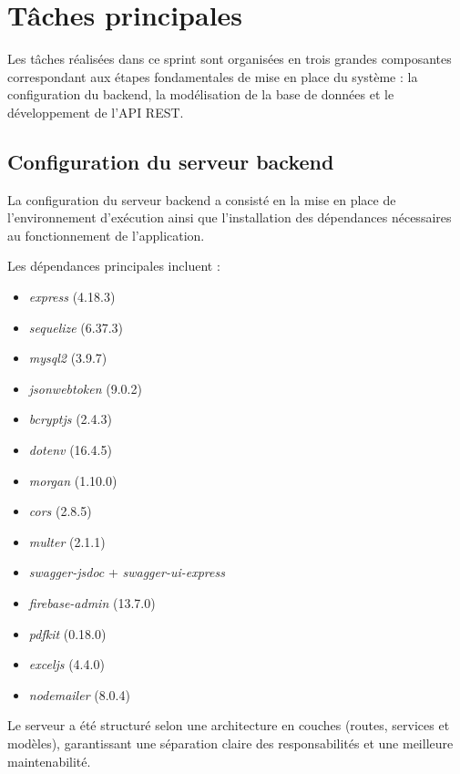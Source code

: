 \section{Tâches principales}
\label{sec:taches_sprint1}

Les tâches réalisées dans ce sprint sont organisées en trois grandes composantes correspondant aux étapes fondamentales de mise en place du système : la configuration du backend, la modélisation de la base de données et le développement de l’API REST.

\subsection{Configuration du serveur backend}
\label{subsec:config_backend}

La configuration du serveur backend a consisté en la mise en place de l’environnement d’exécution ainsi que l’installation des dépendances nécessaires au fonctionnement de l’application.

Les dépendances principales incluent :
\begin{itemize}
    \item \textit{express}\cite{expressjs2024} (4.18.3)
    \item \textit{sequelize}\cite{sequelize2024} (6.37.3)
    \item \textit{mysql2}\cite{mysql2024} (3.9.7)
    \item \textit{jsonwebtoken} (9.0.2)
    \item \textit{bcryptjs} (2.4.3)
    \item \textit{dotenv} (16.4.5)
    \item \textit{morgan} (1.10.0)
    \item \textit{cors} (2.8.5)
    \item \textit{multer} (2.1.1)
    \item \textit{swagger-jsdoc} + \textit{swagger-ui-express}
    \item \textit{firebase-admin}\cite{firebase2024} (13.7.0)
    \item \textit{pdfkit} (0.18.0)
    \item \textit{exceljs} (4.4.0)
    \item \textit{nodemailer} (8.0.4)
\end{itemize}

Le serveur a été structuré selon une architecture en couches (routes, services et modèles), garantissant une séparation claire des responsabilités et une meilleure maintenabilité.

